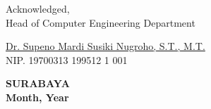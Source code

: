 \endgroup


\begin{center}
  Acknowledged, \\
  Head of Computer Engineering Department\\

  \vspace{8ex}

  \underline{Dr. Supeno Mardi Susiki Nugroho, S.T., M.T.} \\
  NIP. 19700313 199512 1 001
\end{center}

\begin{center}
  \textbf{SURABAYA\\Month, Year}
\end{center}
\endgroup
